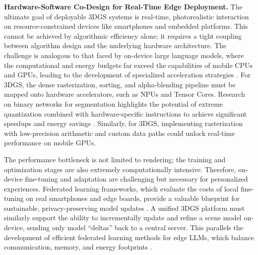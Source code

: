 \documentclass[11pt]{article}
\begin{document}
\textbf{Hardware-Software Co-Design for Real-Time Edge Deployment.} The ultimate goal of deployable 3DGS systems is real-time, photorealistic interaction on resource-constrained devices like smartphones and embedded platforms. This cannot be achieved by algorithmic efficiency alone; it requires a tight coupling between algorithm design and the underlying hardware architecture. The challenge is analogous to that faced by on-device large language models, where the computational and energy budgets far exceed the capabilities of mobile CPUs and GPUs, leading to the development of specialized acceleration strategies \cite{ref783}. For 3DGS, the dense rasterization, sorting, and alpha-blending pipeline must be mapped onto hardware accelerators, such as NPUs and Tensor Cores. Research on binary networks for segmentation highlights the potential of extreme quantization combined with hardware-specific instructions to achieve significant speedups and energy savings \cite{ref784}. Similarly, for 3DGS, implementing rasterization with low-precision arithmetic and custom data paths could unlock real-time performance on mobile GPUs.

The performance bottleneck is not limited to rendering; the training and optimization stages are also extremely computationally intensive. Therefore, on-device fine-tuning and adaptation are challenging but necessary for personalized experiences. Federated learning frameworks, which evaluate the costs of local fine-tuning on real smartphones and edge boards, provide a valuable blueprint for sustainable, privacy-preserving model updates \cite{ref785}. A unified 3DGS platform must similarly support the ability to incrementally update and refine a scene model on-device, sending only model ``deltas'' back to a central server. This parallels the development of efficient federated learning methods for edge LLMs, which balance communication, memory, and energy footprints \cite{ref785}.
\end{document}
